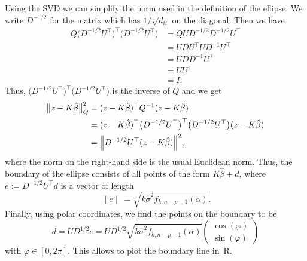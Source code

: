 \documentclass[
  a4paper,
]{article}
\theoremstyle{definition}
\theoremstyle{definition}
\theoremstyle{definition}
\theoremstyle{definition}
\theoremstyle{remark}
\begin{document}
Using the SVD we can simplify the norm used in the
definition of the ellipse. We write \(D^{-1/2}\) for the matrix
which has \(1/\sqrt{d_{ii}}\) on the diagonal. Then we have
\begin{align*}
  Q \bigl(D^{-1/2} U^\top \bigr)^\top \bigl(D^{-1/2} U^\top \bigr)
  &= Q U D^{-1/2} D^{-1/2} U^\top \\
  &= U D U^\top U D^{-1} U^\top \\
  &= U D D^{-1} U^\top \\
  &= U U^\top \\
  &= I.
\end{align*}
Thus, \(\bigl(D^{-1/2} U^\top\bigr)^\top \bigl(D^{-1/2} U^\top\bigr)\) is
the inverse of \(Q\) and we get
\begin{align*}
  \bigl\| z - K \hat\beta \bigr\|_Q^2
  &= (z - K \hat\beta)^\top Q^{-1} (z - K \hat\beta) \\
  &= (z - K \hat\beta)^\top \bigl(D^{-1/2} U^\top\bigr)^\top \bigl(D^{-1/2} U^\top\bigr) (z - K \hat\beta) \\
  &= \Bigl\| D^{-1/2} U^\top (z - K \hat\beta) \Bigr\|^2,
\end{align*}
where the norm on the right-hand side is the usual Euclidean norm.
Thus, the boundary of the ellipse consists of all points of the
form \(K \hat\beta + d\), where \(e := D^{-1/2} U^\top d\) is a vector
of length
\[ \| e \| = \sqrt{k \hat\sigma^2 f_{k,n-p-1}(\alpha)}. \]
Finally, using polar coordinates, we find the points on the boundary
to be
\begin{equation*}
  d
  = U D^{1/2} e
  = U D^{1/2} \sqrt{k \hat\sigma^2 f_{k,n-p-1}(\alpha)}
    \begin{pmatrix}
      \cos(\varphi) \\ \sin(\varphi)
    \end{pmatrix}
\end{equation*}
with \(\varphi\in [0, 2\pi]\). This allows to plot the boundary line in~R.
\end{document}
